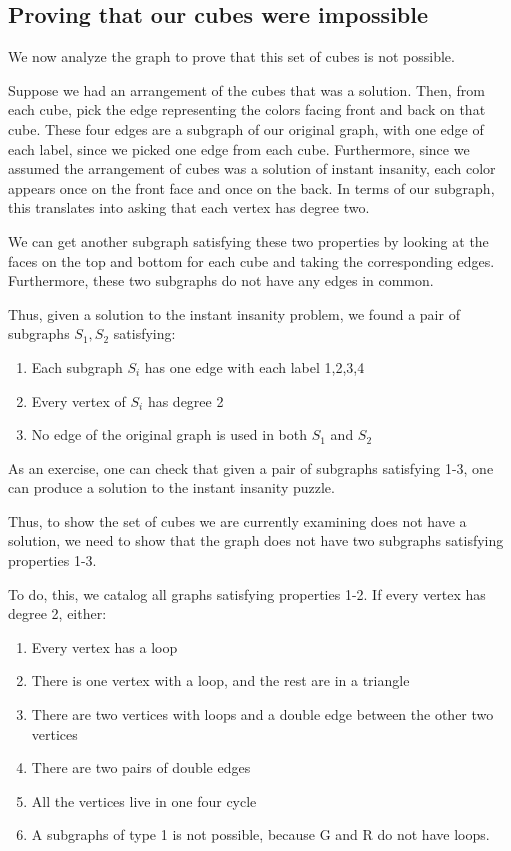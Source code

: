 \documentclass[10pt,]{book}
\theoremstyle{plain}
\theoremstyle{definition}
\theoremstyle{definition}
\theoremstyle{definition}
\begin{document}
\subsection[{Proving that our cubes were impossible}]{Proving that our cubes were impossible}\label{subsection-12}
\hypertarget{p-60}{}%
We now analyze the graph to prove that this set of cubes is not possible.%
\par
\hypertarget{p-61}{}%
Suppose we had an arrangement of the cubes that was a solution. Then, from each cube, pick the edge representing the colors facing front and back on that cube. These four edges are a subgraph of our original graph, with one edge of each label, since we picked one edge from each cube. Furthermore, since we assumed the arrangement of cubes was a solution of instant insanity, each color appears once on the front face and once on the back. In terms of our subgraph, this translates into asking that each vertex has degree two.%
\par
\hypertarget{p-62}{}%
We can get another subgraph satisfying these two properties by looking at the faces on the top and bottom for each cube and taking the corresponding edges. Furthermore, these two subgraphs do not have any edges in common.%
\par
\hypertarget{p-63}{}%
Thus, given a solution to the instant insanity problem, we found a pair of subgraphs \(S_1, S_2\) satisfying: \leavevmode%
\begin{enumerate}
\item\hypertarget{li-11}{}Each subgraph \(S_i\) has one edge with each label 1,2,3,4%
\item\hypertarget{li-12}{}Every vertex of \(S_i\) has degree 2%
\item\hypertarget{li-13}{}No edge of the original graph is used in both \(S_1\) and \(S_2\)%
\end{enumerate}
 As an exercise, one can check that given a pair of subgraphs satisfying 1-3, one can produce a solution to the instant insanity puzzle.%
\par
\hypertarget{p-64}{}%
Thus, to show the set of cubes we are currently examining does not have a solution, we need to show that the graph does not have two subgraphs satisfying properties 1-3.%
\par
\hypertarget{p-65}{}%
To do, this, we catalog all graphs satisfying properties 1-2. If every vertex has degree 2, either: \leavevmode%
\begin{enumerate}
\item\hypertarget{li-14}{}Every vertex has a loop%
\item\hypertarget{li-15}{}There is one vertex with a loop, and the rest are in a triangle%
\item\hypertarget{li-16}{}There are two vertices with loops and a double edge between the other two vertices%
\item\hypertarget{li-17}{}There are two pairs of double edges%
\item\hypertarget{li-18}{}All the vertices live in one four cycle%
\item\hypertarget{li-19}{}A subgraphs of type 1 is not possible, because G and R do not have loops.%
\end{enumerate}
\end{document}

